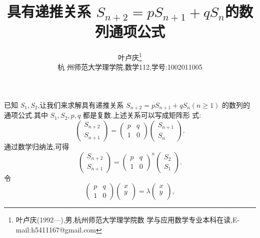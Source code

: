 \documentclass[a4paper]{article}
\begin{document}
\title{\huge{\bf{具有递推关系 $S_{n+2}=pS_{n+1}+qS_n$的数列通项公式}}}
\author{\small{叶卢庆\footnote{叶卢庆(1992---),男,杭州师范大学理学院数
      学与应用数学专业本科在读,E-mail:h5411167@gmail.com}}\\{\small{杭
      州师范大学理学院,数学112,学号:1002011005}}}
\maketitle
已知 $S_1,S_2$,让我们来求解具有递推关系 $S_{n+2}=pS_{n+1}+qS_n(n\geq
1)$ 的数列的通项公式.其中 $S_1,S_2,p,q$ 都是复数.上述关系可以写成矩阵形
式:
\begin{equation}
  \label{eq:1}
  \begin{pmatrix}
    S_{n+2}\\
    S_{n+1}
  \end{pmatrix}=\begin{pmatrix}
    p&q\\
    1&0
  \end{pmatrix}\begin{pmatrix}
    S_{n+1}\\
    S_n
  \end{pmatrix}.
\end{equation}
通过数学归纳法,可得
\begin{equation}
  \label{eq:2}
  \begin{pmatrix}
    S_{n+2}\\
    S_{n+1}
  \end{pmatrix}=\begin{pmatrix}
    p&q\\
    1&0
  \end{pmatrix}^{n}\begin{pmatrix}
    S_2\\
    S_1
  \end{pmatrix}.
\end{equation}
令
\begin{equation}\label{eq:9.27}
  \begin{pmatrix}
    p&q\\
    1&0
  \end{pmatrix}\begin{pmatrix}
    x\\
    y\\
  \end{pmatrix}=\lambda \begin{pmatrix}
    x\\
    y\\
  \end{pmatrix},
\end{equation}
\end{document}
